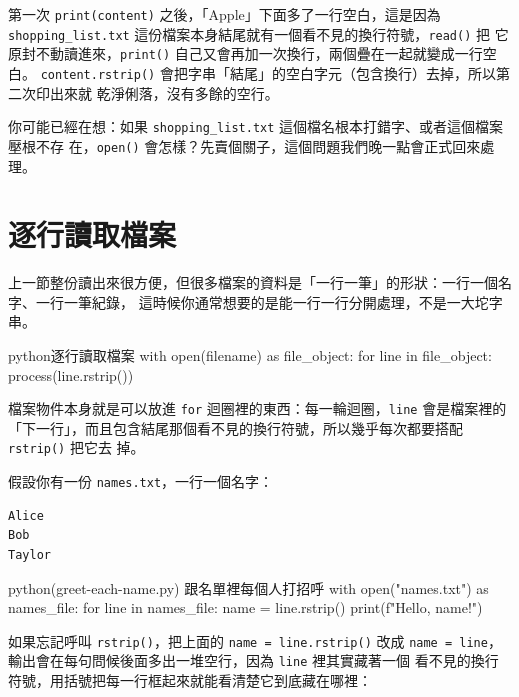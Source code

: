 第一次 \texttt{print(content)} 之後，「Apple」下面多了一行空白，這是因為
\texttt{shopping\_list.txt} 這份檔案本身結尾就有一個看不見的換行符號，\texttt{read()} 把
它原封不動讀進來，\texttt{print()} 自己又會再加一次換行，兩個疊在一起就變成一行空白。
\texttt{content.rstrip()} 會把字串「結尾」的空白字元（包含換行）去掉，所以第二次印出來就
乾淨俐落，沒有多餘的空行。

你可能已經在想：如果 \texttt{shopping\_list.txt} 這個檔名根本打錯字、或者這個檔案壓根不存
在，\texttt{open()} 會怎樣？先賣個關子，這個問題我們晚一點會正式回來處理。

\section{逐行讀取檔案}
\label{sec:reading-lines}

上一節整份讀出來很方便，但很多檔案的資料是「一行一筆」的形狀：一行一個名字、一行一筆紀錄，
這時候你通常想要的是能一行一行分開處理，不是一大坨字串。

\begin{code}{python}{逐行讀取檔案}
with open(filename) as file_object:
    for line in file_object:
        process(line.rstrip())
\end{code}

檔案物件本身就是可以放進 \texttt{for} 迴圈裡的東西：每一輪迴圈，\texttt{line} 會是檔案裡的
「下一行」，而且包含結尾那個看不見的換行符號，所以幾乎每次都要搭配 \texttt{rstrip()} 把它去
掉。

假設你有一份 \texttt{names.txt}，一行一個名字：

\begin{verbatim}
Alice
Bob
Taylor
\end{verbatim}

\begin{example}{python}{(greet-each-name.py) 跟名單裡每個人打招呼}
with open("names.txt") as names_file:
    for line in names_file:
        name = line.rstrip()
        print(f"Hello, {name}!")
\end{example}


如果忘記呼叫 \texttt{rstrip()}，把上面的 \texttt{name = line.rstrip()} 改成
\texttt{name = line}，輸出會在每句問候後面多出一堆空行，因為 \texttt{line} 裡其實藏著一個
看不見的換行符號，用括號把每一行框起來就能看清楚它到底藏在哪裡：

